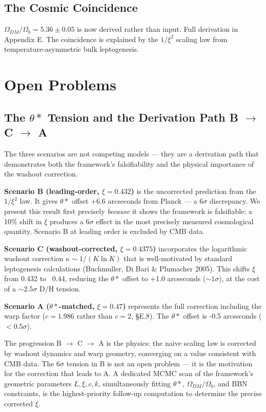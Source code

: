 \documentclass[aps,prd,preprint,superscriptaddress,longbibliography]{revtex4-2}
\begin{document}
\subsection{The Cosmic Coincidence}

$\Omega_{DM}/\Omega_b = 5.36 \pm 0.05$ is now derived rather than input. Full derivation in Appendix E. The coincidence is explained by the $1/\xi^{2}$ scaling law from temperature-asymmetric bulk leptogenesis.



\section{Open Problems}


\subsection{The $\theta*$ Tension and the Derivation Path B $\to$ C $\to$ A}

The three scenarios are not competing models --- they are a derivation path that demonstrates both the framework's falsifiability and the physical importance of the washout correction.

\textbf{Scenario B (leading-order, $\xi = 0.432$)} is the uncorrected prediction from the $1/\xi^{2}$ law. It gives $\theta*$ offset +6.6 arcseconds from Planck --- a $6\sigma$ discrepancy. We present this result first precisely \textit{because} it shows the framework is falsifiable: a 10\% shift in $\xi$ produces a $6\sigma$ effect in the most precisely measured cosmological quantity. Scenario B at leading order is excluded by CMB data.

\textbf{Scenario C (washout-corrected, $\xi = 0.4375$)} incorporates the logarithmic washout correction $\kappa \sim  1/(K \ln K)$ that is well-motivated by standard leptogenesis calculations (Buchmuller, Di Bari \& Plumacher 2005). This shifts $\xi$ from 0.432 to ~0.44, reducing the $\theta*$ offset to +1.0 arcseconds ($\sim 1\sigma$), at the cost of a $\sim 2.5\sigma$ D/H tension.

\textbf{Scenario A ($\theta*$-matched, $\xi = 0.47$)} represents the full correction including the warp factor ($c = 1.986$ rather than $c = 2$, \S{}E.8). The $\theta*$ offset is -0.5 arcseconds ($< 0.5\sigma$).

The progression B $\to$ C $\to$ A is the physics: the naive scaling law is corrected by washout dynamics and warp geometry, converging on a value consistent with CMB data. The $6\sigma$ tension in B is not an open problem --- it is the motivation for the correction that leads to A. A dedicated MCMC scan of the framework's geometric parameters ${L, \xi, c, k}$, simultaneously fitting $\theta*$, $\Omega_{DM}/\Omega_b$, and BBN constraints, is the highest-priority follow-up computation to determine the precise corrected $\xi$.
\end{document}

